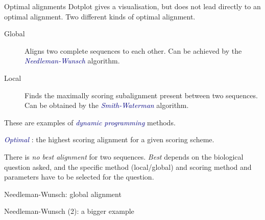 \documentclass[pdf]{beamer}
\begin{document}
\begin{frame}{Optimal alignments}
  Dotplot gives a visualisation, but does not lead directly to
  an optimal alignment. Two different kinds of optimal alignment.
  \begin{description}
  \item[Global] Aligns two complete sequences to each other. Can
    be achieved by the \textcolor{navy}{\emph{Needleman-Wunsch}} algorithm.
  \item[Local] Finds the maximally scoring subalignment present
    between two sequences. Can be obtained by the \textcolor{navy}{\emph{Smith-Waterman}}
    algorithm.
  \end{description}
  \pause
  These are examples of \textcolor{navy}{\emph{dynamic programming}} methods.

  \textcolor{navy}{\emph{Optimal}} : the highest scoring alignment for a given scoring scheme.

  There is \emph{no best alignment} for two sequences. \emph{Best} depends on
  the biological question asked, and the specific method (local/global) and
  scoring method and parameters have to be selected for the question.
\end{frame}

\begin{frame}{Needleman-Wunsch: global alignment}
  \begin{figure}[ht]
    \begin{tikzpicture}[scale=0.5]
      
    \end{tikzpicture}
  \end{figure}

\end{frame}

\begin{frame}{Needleman-Wunsch (2): a bigger example}
  \begin{figure}[ht]
    \begin{tikzpicture}[scale=0.4]
      
    \end{tikzpicture}
  \end{figure}

\end{frame}

\end{document}
